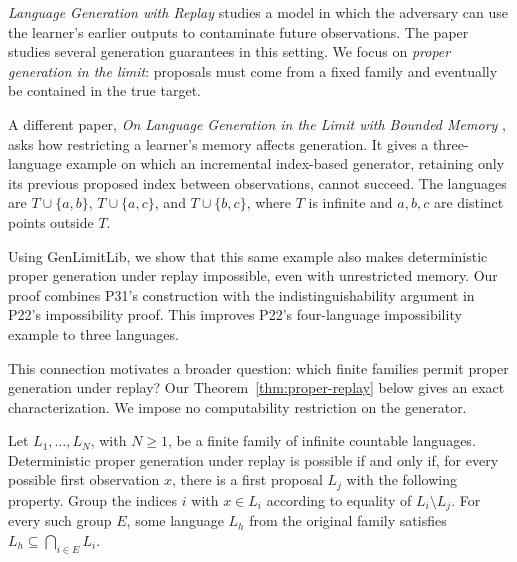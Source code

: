 \emph{Language Generation with Replay} \citep[][P22]{replay}
studies a model in which the adversary can use the learner's earlier outputs to contaminate future observations. The paper studies several generation guarantees in this setting. We focus on \emph{proper generation in the limit}: proposals must come from a fixed family and eventually be contained in the true target.

A different paper, \emph{On Language Generation in the Limit with
Bounded Memory} \citep[][P31]{memory}, asks how restricting a
learner's memory affects generation. It gives a three-language
example on which an incremental index-based generator, retaining only its
previous proposed index between observations, cannot succeed. The languages are
$T\cup\{a,b\}$, $T\cup\{a,c\}$, and $T\cup\{b,c\}$,
where $T$ is infinite and $a,b,c$ are distinct points outside $T$.

Using GenLimitLib, we show that this same example also makes deterministic proper
generation under replay impossible, even with unrestricted memory.
Our proof combines P31's construction with the indistinguishability
argument in P22's impossibility proof. This improves
P22's four-language impossibility example to three languages.

This connection motivates a broader question: which finite
families permit proper generation under replay?
Our Theorem~\ref{thm:proper-replay} below gives an exact characterization.
We impose no computability restriction on the generator.
\begin{result}
\label{thm:proper-replay}
Let $L_1,\ldots,L_N$, with $N\ge1$, be a finite family of infinite countable
languages. Deterministic proper generation under replay is possible
if and only if, for every possible first observation $x$, there is
a first proposal $L_j$ with the following property.
Group the indices $i$ with $x\in L_i$ according to equality of
$L_i\setminus L_j$. For every such group $E$, some language $L_h$
from the original family satisfies
$L_h\subseteq\bigcap_{i\in E}L_i$.
\end{result}
